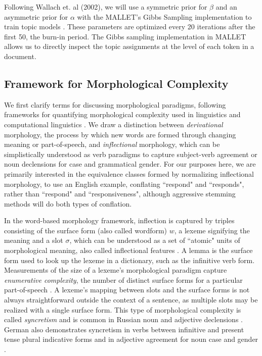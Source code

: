 \documentclass[11pt,a4paper]{article}
\begin{document}
Following Wallach et. al (2002), we will use a symmetric prior for $\beta$ and an asymmetric prior for $\alpha$ with the MALLET's Gibbs Sampling implementation to train topic models \cite{wallach2009rethinking,McCallumMALLET}. These parameters are optimized every 20 iterations after the first 50, the burn-in period. The Gibbs sampling implementation in MALLET allows us to directly inspect the topic assignments at the level of each token in a document.

\subsection{Framework for Morphological Complexity}
We first clarify terms for discussing morphological paradigms, following frameworks for quantifying morphological complexity used in linguistics and computational linguistics \cite{baerman2015intro,Ackerman2013MorphologicalOT, cotterell-etal-2019-complexity}. We draw a distinction between \textit{derivational} morphology, the process by which new words are formed through changing meaning or part-of-speech, and \textit{inflectional} morphology, which can be simplistically understood as verb paradigms to capture subject-verb agreement or noun declensions for case and grammatical gender. For our purposes here, we are primarily interested in the equivalence classes formed by normalizing inflectional morphology, to use an English example, conflating ``respond" and ``responds", rather than ``respond" and ``responsiveness", although aggressive stemming methods will do both types of conflation.

In the word-based morphology framework, inflection is captured by triples consisting of the surface form (also called wordform) $w$, a lexeme  signifying the meaning and a slot $\sigma$, which can be understood as a set of ``atomic" units of morphological meaning, also called inflectional features \cite{aronoff1976word,sylak-glassman-etal-2015-language,cotterell-etal-2019-complexity}.
A lemma is the surface form used to look up the lexeme in a dictionary, such as the infinitive verb form. Measurements of the size of a lexeme's morphological paradigm capture \textit{enumerative complexity}, the number of distinct surface forms for a particular part-of-speech \cite{Ackerman2013MorphologicalOT}. A lexeme's mapping between slots and the surface forms is not always straightforward outside the context of a sentence, as multiple slots may be realized with a single surface form. This type of morphological complexity is called \textit{syncretism} and is common in Russian noun and adjective declensions \cite{baerman2015understanding,Milizia2015PatternsOS}. German also demonstrates syncretism in verbs between infinitive and present tense plural indicative forms and in adjective agreement for noun case and gender \cite{Crysmann2005SyncretismIG}.
\end{document}
